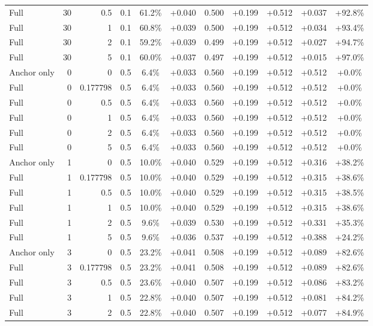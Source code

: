 \begin{table}[htbp]
\begin{tabular}{lrrrccccccc}
Full & 30 & 0.5 & 0.1 & 61.2\% & +0.040 & 0.500 & +0.199 & +0.512 & +0.037 & +92.8\% \\
Full & 30 & 1 & 0.1 & 60.8\% & +0.039 & 0.500 & +0.199 & +0.512 & +0.034 & +93.4\% \\
Full & 30 & 2 & 0.1 & 59.2\% & +0.039 & 0.499 & +0.199 & +0.512 & +0.027 & +94.7\% \\
Full & 30 & 5 & 0.1 & 60.0\% & +0.037 & 0.497 & +0.199 & +0.512 & +0.015 & +97.0\% \\
Anchor only & 0 & 0 & 0.5 & 6.4\% & +0.033 & 0.560 & +0.199 & +0.512 & +0.512 & +0.0\% \\
Full & 0 & 0.177798 & 0.5 & 6.4\% & +0.033 & 0.560 & +0.199 & +0.512 & +0.512 & +0.0\% \\
Full & 0 & 0.5 & 0.5 & 6.4\% & +0.033 & 0.560 & +0.199 & +0.512 & +0.512 & +0.0\% \\
Full & 0 & 1 & 0.5 & 6.4\% & +0.033 & 0.560 & +0.199 & +0.512 & +0.512 & +0.0\% \\
Full & 0 & 2 & 0.5 & 6.4\% & +0.033 & 0.560 & +0.199 & +0.512 & +0.512 & +0.0\% \\
Full & 0 & 5 & 0.5 & 6.4\% & +0.033 & 0.560 & +0.199 & +0.512 & +0.512 & +0.0\% \\
Anchor only & 1 & 0 & 0.5 & 10.0\% & +0.040 & 0.529 & +0.199 & +0.512 & +0.316 & +38.2\% \\
Full & 1 & 0.177798 & 0.5 & 10.0\% & +0.040 & 0.529 & +0.199 & +0.512 & +0.315 & +38.6\% \\
Full & 1 & 0.5 & 0.5 & 10.0\% & +0.040 & 0.529 & +0.199 & +0.512 & +0.315 & +38.5\% \\
Full & 1 & 1 & 0.5 & 10.0\% & +0.040 & 0.529 & +0.199 & +0.512 & +0.315 & +38.6\% \\
Full & 1 & 2 & 0.5 & 9.6\% & +0.039 & 0.530 & +0.199 & +0.512 & +0.331 & +35.3\% \\
Full & 1 & 5 & 0.5 & 9.6\% & +0.036 & 0.537 & +0.199 & +0.512 & +0.388 & +24.2\% \\
Anchor only & 3 & 0 & 0.5 & 23.2\% & +0.041 & 0.508 & +0.199 & +0.512 & +0.089 & +82.6\% \\
Full & 3 & 0.177798 & 0.5 & 23.2\% & +0.041 & 0.508 & +0.199 & +0.512 & +0.089 & +82.6\% \\
Full & 3 & 0.5 & 0.5 & 23.6\% & +0.040 & 0.507 & +0.199 & +0.512 & +0.086 & +83.2\% \\
Full & 3 & 1 & 0.5 & 22.8\% & +0.040 & 0.507 & +0.199 & +0.512 & +0.081 & +84.2\% \\
Full & 3 & 2 & 0.5 & 22.8\% & +0.040 & 0.507 & +0.199 & +0.512 & +0.077 & +84.9\% \\

\end{tabular}
\end{table}

